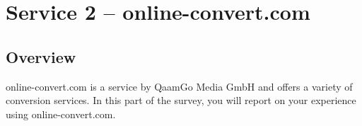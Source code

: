 \section{Service 2 – online-convert.com}
\subsection{Overview}
online-convert.com is a service by QaamGo Media GmbH and offers a variety of conversion services. In this part of the survey, you will report on your experience using online-convert.com. 


\clearpage

\clearpage
